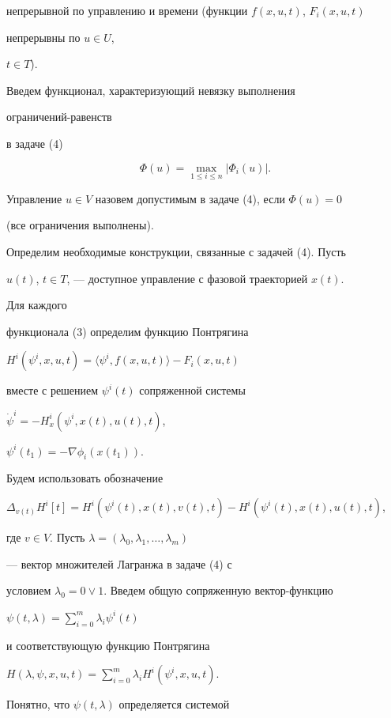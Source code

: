 непрерывной по управлению и времени (функции $f(x,u,t)$, $F_i(x,u,t)$ 


непрерывны по $u\in U$, 


$t\in T$). 


 


Введем функционал, характеризующий невязку выполнения 


ограничений-равенств 


в задаче (4) 


$$ 


\Phi(u)=\max_{1\le i\le n}|\Phi_i(u)|. 


$$ 


Управление $u\in V$ назовем допустимым в задаче (4), если $\Phi(u)=0$ 


(все ограничения выполнены). 


 


Определим необходимые конструкции, связанные с задачей (4). Пусть 


$u(t)$, $t\in T$, --- доступное управление с фазовой траекторией $x(t)$. 


Для каждого 


функционала (3) определим функцию Понтрягина 


$H^i(\psi^i,x,u,t)=\langle\psi^i,f(x,u,t)\rangle-F_i(x,u,t)$ 


вместе с решением $\psi^i(t)$ сопряженной системы 


$\Dot\psi^i=-H^i_x(\psi^i,x(t),u(t),t)$, 


$\psi^i(t_1)=-\nabla\phi_i(x(t_1))$. 


Будем использовать обозначение 


$\Delta_{v(t)}H^i[t]=H^i(\psi^i(t),x(t),v(t),t)- 


H^i(\psi^i(t),x(t),u(t),t)$, 


где $v\in V$. Пусть $\lambda=(\lambda_0,\lambda_1,\dotsc,\lambda_m)$ 


--- вектор множителей Лагранжа в задаче (4) с 


условием $\lambda_0=0\vee 1$. Введем общую сопряженную вектор-функцию 


$\psi(t,\lambda)=\sum\limits^m_{i=0}\lambda_i\psi^i(t)$ 


и соответствующую функцию Понтрягина 


$H(\lambda,\psi,x,u,t)=\sum\limits^m_{i=0} 


\lambda_i H^i(\psi^i,x,u,t)$. 


Понятно, что $\psi(t,\lambda)$ определяется системой 


